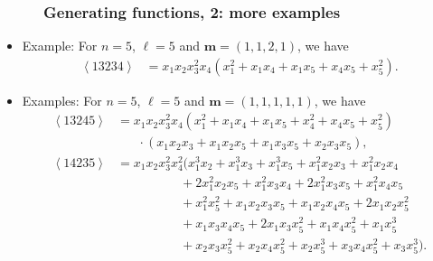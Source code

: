 \documentclass{beamer}
\newcommand{\fti}[1]{\frametitle{\ \ \ \ \ #1}}
\newcommand{\tup}[1]{\left( #1 \right)}
\theoremstyle{plain}
\newcommand{\0}{\phantom{c}}
\newcommand{\swt}[1]{\left\langle #1 \right\rangle} %
\newcommand{\mm}{\mathbf{m}}
\begin{document}
\begin{frame}
\fti{Generating functions, 2: more examples}

\begin{itemize}

\item Example: For $n = 5$, $\ell = 5$ and $\mm = \tup{1,1,2,1}$, we have
\begin{align*}
\swt{13234} & = x_1 x_2 x_3^2 x_4 (x_1^2 + x_1 x_4 + x_1 x_5 + x_4 x_5 + x_5^2).
\end{align*}

\pause
\item Examples: For $n = 5$, $\ell = 5$ and $\mm = \tup{1,1,1,1,1}$, we have
\begin{align*}
\swt{13245} & = x_1 x_2 x_3^2 x_4 (x_1^2 + x_1x_4 + x_1x_5 + x_4^2 + x_4x_5 + x_5^2)
\\ & \hspace{20pt} \cdot (x_1x_2x_3 + x_1x_2x_5+x_1x_3x_5+x_2x_3x_5),
\\ \swt{14235} & = x_1x_2x_3^2x_4^2 (x_1^3x_2 + x_1^3x_3 + x_1^3x_5 + x_1^2x_2x_3 + x_1^2x_2x_4
\\ & \hspace{60pt} + 2x_1^2x_2x_5 + x_1^2x_3x_4 + 2x_1^2x_3x_5 + x_1^2x_4x_5
\\ & \hspace{60pt}  + x_1^2x_5^2 + x_1x_2x_3x_5+ x_1x_2x_4x_5 + 2x_1x_2x_5^2
\\ & \hspace{60pt}  + x_1x_3x_4x_5 + 2x_1x_3x_5^2 + x_1x_4x_5^2 + x_1x_5^3 
\\ & \hspace{60pt} + x_2x_3x_5^2 + x_2x_4x_5^2 + x_2x_5^3 + x_3x_4x_5^2 + x_3x_5^3).
\end{align*}

\end{itemize}

\vspace{10cm}
\end{frame}
\end{document}

